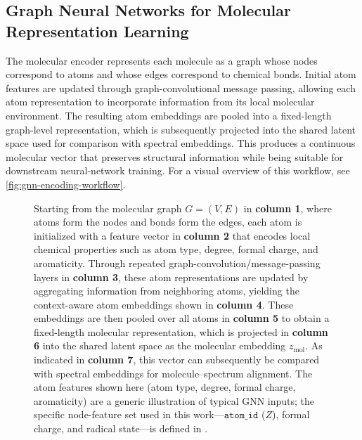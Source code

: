 \subsection{Graph Neural Networks for Molecular Representation Learning}
The molecular encoder represents each molecule as a graph whose nodes correspond to atoms and whose edges correspond to chemical bonds. 
Initial atom features are updated through graph-convolutional message passing, allowing each atom representation to incorporate information from its local molecular environment. 
The resulting atom embeddings are pooled into a fixed-length graph-level representation, which is subsequently projected into the shared latent space used for comparison with spectral embeddings. 
This produces a continuous molecular vector that preserves structural information while being suitable for downstream neural-network training.
For a visual overview of this workflow, see \autoref{fig:gnn-encoding-workflow}.


\begin{figure}[ht]
    \centering
    \resizebox{0.9\textwidth}{!}{%
    }
    \caption[Graph-convolutional molecular encoding workflow]{
        Starting from the molecular graph $G=(V,E)$ in \textbf{column 1}, where atoms form the nodes and bonds form the edges, each atom is initialized with a feature vector in \textbf{column 2} that encodes local chemical properties such as atom type, degree, formal charge, and aromaticity. 
        Through repeated graph-convolution/message-passing layers in \textbf{column 3}, these atom representations are updated by aggregating information from neighboring atoms, yielding the context-aware atom embeddings shown in \textbf{column 4}. 
        These embeddings are then pooled over all atoms in \textbf{column 5} to obtain a fixed-length molecular representation, which is projected in \textbf{column 6} into the shared latent space as the molecular embedding $z_{\mathrm{mol}}$. 
        As indicated in \textbf{column 7}, this vector can subsequently be compared with spectral embeddings for molecule--spectrum alignment.
        The atom features shown here (atom type, degree, formal charge, aromaticity) are a generic illustration of typical GNN inputs; the specific node-feature set used in this work---$\texttt{atom\_id}$ ($Z$), formal charge, and radical state---is defined in .
    }
    \label{fig:gnn-encoding-workflow}
\end{figure}




